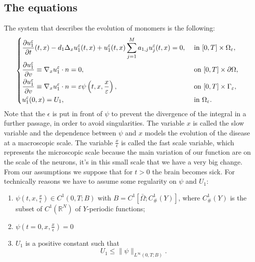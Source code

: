 \subsection{The equations}
The system that describes the evolution of monomers is the following:
\begin{equation}
    \begin{dcases}
    \frac{\partial u_{1}^{\epsilon}}{\partial t}(t, x)-d_{1} \Delta_{x} u_{1}^{\epsilon}(t, x)+u_{1}^{\epsilon}(t, x) \sum_{j=1}^{M} a_{1, j} u_{j}^{\epsilon}(t, x)=0, & \text { in }[0, T] \times \Omega_{\epsilon},\\
    \frac{\partial u^{\epsilon}_1}{\partial v} \equiv \nabla_{x} u^{\epsilon}_1\cdot n=0, & \text { on }[0, T]\times\partial\Omega,\\
    \frac{\partial u^{\epsilon}_{1}}{\partial v} \equiv \nabla_{x} u^{\epsilon}_1 \cdot n=\epsilon \psi\left(t, x,\frac{x}{\epsilon}\right), & \text { on }[0, T] \times \Gamma_{\epsilon},\\
    u_{1}^{\epsilon}(0, x)=U_{1}, & \text{ in }\Omega_{\epsilon}.
    \end{dcases}
\label{eq:u_1_eqs}\end{equation}
Note that the $\epsilon$ is put in front of $\psi$ to prevent the divergence of the integral in a further passage, in order to avoid singularities. 
The variable $x$ is called the slow variable and the dependence between $\psi$ and $x$ models the evolution of the disease at a macroscopic scale. The variable
$\frac{x}{\epsilon}$ is called the fast scale variable, which represents the microscopic scale because the main variation of our function are on the scale of the neurons, it's in this small scale that we have a very big change.\\
From our assumptions we suppose that for $t>0$ the brain becomes sick. For technically reasons we have to assume some regularity on $\psi$ and $U_1$:
\begin{enumerate}
    \item $\psi\left(t, x, \frac{x}{\epsilon}\right) \in C^{1}(0, T ; B)$ with $B=C^{1}\left[\bar{\Omega} ; C_{\text {\# }}^{1}(Y)\right]$, where $C_{\#}^{1}(Y)$ is the subset of $C^{1}\left(\mathbb{R}^{N}\right)$ of $Y$-periodic functions;
    \item $\psi\left(t=0, x, \frac{x}{\epsilon}\right)=0$
    \item 
$U_{1}$ is a positive constant such that
\begin{equation}
  U_{1} \leq\|\psi\|_{L^{\infty}(0, T ; B)} .
\label{eq:U_1_norm}\end{equation}
\end{enumerate}
